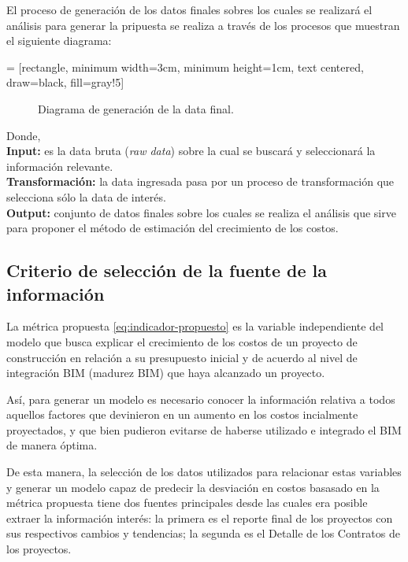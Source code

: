 El proceso de generación de los datos finales sobres los cuales se realizará el análisis para generar la pripuesta se realiza a través de los procesos que muestran el siguiente diagrama:

 = [rectangle, minimum width=3cm, minimum height=1cm, text centered, draw=black, fill=gray!5]

\begin{figure}[H]
    \centering
    \caption{Diagrama de generación de la data final.}
    \label{fig:data-final}
\end{figure}

\noindent
Donde,\\
\textbf{Input:} es la data bruta (\emph{raw data}) sobre la cual se buscará y seleccionará la información relevante.\\
\textbf{Transformación:} la data ingresada pasa por un proceso de transformación que selecciona sólo la data de interés.\\
\textbf{Output:} conjunto de datos finales sobre los cuales se realiza el análisis que sirve para proponer el método de estimación del crecimiento de los costos.

\subsection{Criterio de selección de la fuente de la información}

La métrica propuesta \eqref{eq:indicador-propuesto} es la variable independiente del modelo que busca explicar el crecimiento de los costos de un proyecto de construcción en relación a su presupuesto inicial y de acuerdo al nivel de integración BIM (madurez BIM) que haya alcanzado un proyecto. 

Así, para generar un modelo es necesario conocer la información relativa a todos aquellos factores que devinieron en un aumento en los costos incialmente proyectados, y que bien pudieron evitarse de haberse utilizado e integrado el BIM de manera óptima.

De esta manera, la selección de los datos utilizados para relacionar estas variables y generar un modelo capaz de predecir la desviación en costos basasado en la métrica propuesta tiene dos fuentes principales desde las cuales era posible extraer la información interés: la primera es el reporte final de los proyectos con sus respectivos cambios y tendencias; la segunda es el Detalle de los Contratos de los proyectos.

